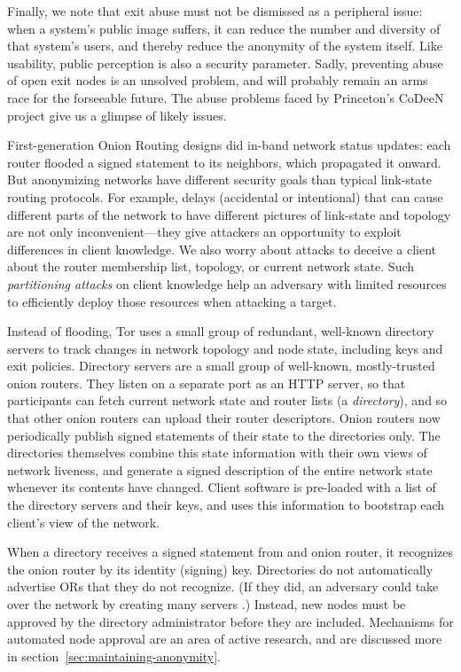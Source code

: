 \documentclass[times,10pt,twocolumn]{article}
\begin{document}
Finally, we note that exit abuse must not be dismissed as a peripheral
issue: when a system's public image suffers, it can reduce the number
and diversity of that system's users, and thereby reduce the anonymity
of the system itself.  Like usability, public perception is also a
security parameter.  Sadly, preventing abuse of open exit nodes is an
unsolved problem, and will probably remain an arms race for the
forseeable future.  The abuse problems faced by Princeton's CoDeeN
project \cite{darkside} give us a glimpse of likely issues.

\label{subsec:dirservers}

First-generation Onion Routing designs \cite{or-jsac98,freedom2-arch} did
in-band network status updates: each router flooded a signed statement
to its neighbors, which propagated it onward. But anonymizing networks
have different security goals than typical link-state routing protocols.
For example, delays (accidental or intentional)
that can cause different parts of the network to have different pictures
of link-state and topology are not only inconvenient---they give
attackers an opportunity to exploit differences in client knowledge.
We also worry about attacks to deceive a
client about the router membership list, topology, or current network
state. Such \emph{partitioning attacks} on client knowledge help an
adversary with limited resources to efficiently deploy those resources
when attacking a target.

Instead of flooding, Tor uses a small group of redundant, well-known
directory servers to track changes in network topology and node state,
including keys and exit policies.  Directory servers are a small group
of well-known, mostly-trusted onion routers.  They listen on a
separate port as an HTTP server, so that participants can fetch
current network state and router lists (a \emph{directory}), and so
that other onion routers can upload their router descriptors.  Onion
routers now periodically publish signed statements of their state to
the directories only.  The directories themselves combine this state
information with their own views of network liveness, and generate a
signed description of the entire network state whenever its contents
have changed.  Client software is pre-loaded with a list of the
directory servers and their keys, and uses this information to
bootstrap each client's view of the network.

When a directory receives a signed statement from and onion router, it
recognizes the onion router by its identity (signing) key.
Directories do not automatically advertise ORs that they do not
recognize.  (If they did, an adversary could take over the network by
creating many servers \cite{sybil}.)  Instead, new nodes must be
approved by the directory administrator before they are included.
Mechanisms for automated node approval are an area of active research,
and are discussed more in section~\ref{sec:maintaining-anonymity}.
  
\end{document}
